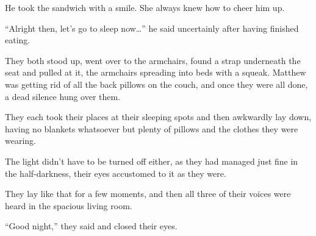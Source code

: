 He took the sandwich with a smile. She always knew how to cheer him up.

“Alright then, let's go to sleep now…” he said uncertainly after having finished eating.

They both stood up, went over to the armchairs, found a strap underneath the seat and pulled at it, the armchairs spreading into beds with a squeak. Matthew was getting rid of all the back pillows on the couch, and once they were all done, a dead silence hung over them.

They each took their places at their sleeping spots and then awkwardly lay down, having no blankets whatsoever but plenty of pillows and the clothes they were wearing.

The light didn't have to be turned off either, as they had managed just fine in the half-darkness, their eyes accustomed to it as they were.

They lay like that for a few moments, and then all three of their voices were heard in the spacious living room.

“Good night,” they said and closed their eyes.